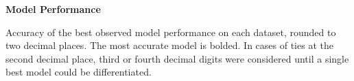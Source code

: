 
\begin{table*}[htbp]
    \renewcommand{\familydefault}{\sfdefault}\normalfont
    \centering
    \caption{\bf Model Performance}

    \begin{tableminipage}{\textwidth}

        

        \label{tab:model-comparison}
        \footnotesize  

        Accuracy of the best observed model performance on each dataset,
        rounded to two decimal places. The most accurate model is bolded. 
        In cases of ties at the second decimal place, third or fourth decimal
        digits were considered until a single best model could be differentiated.
        
    \end{tableminipage}
\end{table*}
